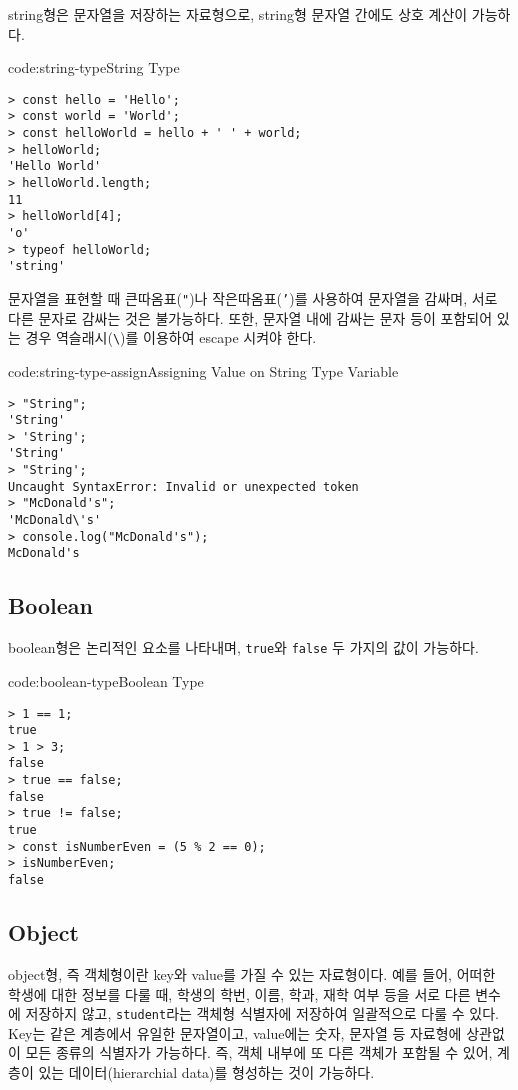 string형은 문자열을 저장하는 자료형으로, string형 문자열 간에도 상호 계산이 가능하다.

\begin{codeenv}{code:string-type}{String Type}\begin{verbatim}
> const hello = 'Hello';
> const world = 'World';
> const helloWorld = hello + ' ' + world;
> helloWorld;
'Hello World'
> helloWorld.length;
11
> helloWorld[4];
'o'
> typeof helloWorld;
'string'
\end{verbatim}
\end{codeenv}

문자열을 표현할 때 큰따옴표(\texttt{"})나 작은따옴표(\texttt{'})를 사용하여 문자열을 감싸며, 서로 다른 문자로 감싸는 것은 불가능하다. 또한, 문자열 내에 감싸는 문자 등이 포함되어 있는 경우 역슬래시(\verb|\|)를 이용하여 escape 시켜야 한다.

\begin{codeenv}{code:string-type-assign}{Assigning Value on String Type Variable}\begin{verbatim}
> "String";
'String'
> 'String';
'String'
> "String';
Uncaught SyntaxError: Invalid or unexpected token
> "McDonald's";
'McDonald\'s'
> console.log("McDonald's");
McDonald's
\end{verbatim}
\end{codeenv}

\subsection*{Boolean}

boolean형은 논리적인 요소를 나타내며, \texttt{true}와 \texttt{false} 두 가지의 값이 가능하다.

\begin{codeenv}{code:boolean-type}{Boolean Type}\begin{verbatim}
> 1 == 1;
true
> 1 > 3;
false
> true == false;
false
> true != false;
true
> const isNumberEven = (5 % 2 == 0);
> isNumberEven;
false
\end{verbatim}
\end{codeenv}

\subsection*{Object}

object형, 즉 객체형이란 key와 value를 가질 수 있는 자료형이다. 예를 들어, 어떠한 학생에 대한 정보를 다룰 때, 학생의 학번, 이름, 학과, 재학 여부 등을 서로 다른 변수에 저장하지 않고, \texttt{student}라는 객체형 식별자에 저장하여 일괄적으로 다룰 수 있다. Key는 같은 계층에서 유일한 문자열이고, value에는 숫자, 문자열 등 자료형에 상관없이 모든 종류의 식별자가 가능하다. 즉, 객체 내부에 또 다른 객체가 포함될 수 있어, 계층이 있는 데이터(hierarchial data)를 형성하는 것이 가능하다.

